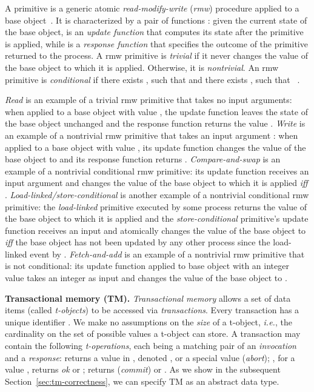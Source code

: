 A primitive is a generic atomic \emph{read-modify-write} (\emph{rmw}) procedure applied to a base object~\cite{G05,Her91}.
It is characterized by a pair of functions :
given the current state of the base object,  is an \emph{update function} that
computes its state after the primitive is applied, while  
is a \emph{response function} that specifies the outcome of the primitive returned to the process.
A rmw primitive is \emph{trivial} if it never changes the value of the base object to which it is applied.
Otherwise, it is \emph{nontrivial}.
An rmw primitive  is \emph{conditional} if there exists ,  such that
 and there exists ,  such that
~\cite{cond-04}.

\emph{Read} is an example of a trivial rmw primitive that takes no input arguments: when applied
to a base object with value , the update function leaves the state of the base object unchanged and 
the response function returns the value .
\emph{Write} is an example of a nontrivial rmw primitive that takes an input argument : when applied to a base object
with value , its update function changes the value of the base object to  and its response function
returns .
\emph{Compare-and-swap} is an example of a nontrivial conditional rmw primitive: its update function receives an input argument 
 and changes the value  of the base object to which it is applied \emph{iff} .
\emph{Load-linked/store-conditional} is another example of a nontrivial conditional rmw primitive:
the \emph{load-linked} primitive executed by some process  returns the value of the base object to which
it is applied and the \emph{store-conditional} primitive's update function receives an input  and 
atomically changes the value of the base object to 
\emph{iff} the base object has not been updated by any other process since the load-linked event by .
\emph{Fetch-and-add} is an example of a nontrivial rmw primitive that is not conditional: its update
function applied to base object with an integer value  takes an integer  as input
and changes the value of the base object to .

\vspace{1mm}\noindent\textbf{Transactional memory (TM).}
\emph{Transactional memory}
allows a set of data items (called \emph{t-objects}) to be accessed 
via \emph{transactions}.
Every transaction  has a unique identifier . 
We make no assumptions on the \emph{size} of a t-object, \emph{i.e.}, 
the cardinality on the set  of possible values a t-object can store.
A transaction  may contain the following \emph{t-operations},
each being a matching pair of an \emph{invocation} and a \emph{response}:
 returns a value in , denoted , 
or a special value  (\emph{abort});
, for a value ,
returns \textit{ok} or ;
 returns  (\emph{commit}) or .
As we show in the subsequent Section~\ref{sec:tm-correctness}, we can specify
TM as an abstract data type.

